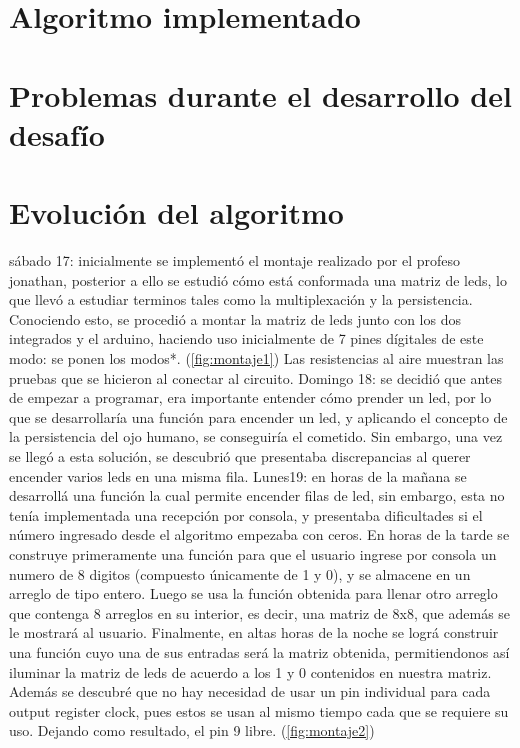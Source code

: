 \documentclass{article}
\begin{document}
\section{Algoritmo implementado} \label{imagenes}
\section{Problemas durante el desarrollo del desafío} \label{imagenes}
\section{Evolución del algoritmo} \label{imagenes}
sábado 17: inicialmente se implementó el montaje realizado por el profeso jonathan, posterior a ello se estudió cómo está conformada una matriz de leds, lo que llevó a estudiar terminos tales como la multiplexación y la persistencia. Conociendo esto, se procedió a montar la matriz de leds junto con los dos integrados y el arduino, haciendo uso inicialmente de 7 pines dígitales de este modo: se ponen los modos*. (\ref{fig:montaje1})
Las resistencias al aire muestran las pruebas que se hicieron al conectar al circuito. 
\newline Domingo 18: se decidió que antes de empezar a programar, era importante entender cómo prender un led, por lo que se desarrollaría una función para encender un led, y aplicando el concepto de la persistencia del ojo humano, se conseguiría el cometido. Sin embargo, una vez se llegó a esta solución, se descubrió que presentaba discrepancias al querer encender varios leds en una misma fila. 
\newline
Lunes19: en horas de la mañana se desarrollá una función la cual permite encender filas de led, sin embargo, esta no tenía implementada una recepción por consola, y presentaba dificultades si el número ingresado desde el algoritmo empezaba con ceros.
 En horas de la tarde se construye primeramente una función para que el usuario ingrese por consola un numero de 8 digitos (compuesto únicamente de 1 y 0), y se almacene en un arreglo de tipo entero. Luego se usa la función obtenida para  llenar otro arreglo que contenga 8 arreglos en su interior, es decir, una matriz de 8x8, que además se le mostrará al usuario.
 Finalmente, en altas horas de la noche se lográ construir una función cuyo una de sus entradas será la matriz obtenida, permitiendonos así iluminar la matriz de leds de acuerdo a los 1 y 0 contenidos en nuestra matriz.
 Además se descubré que no hay necesidad de usar un pin individual para cada output register clock, pues estos se usan al mismo tiempo cada que se requiere su uso. Dejando como resultado, el pin 9 libre. (\ref{fig:montaje2})
 
\end{document}
